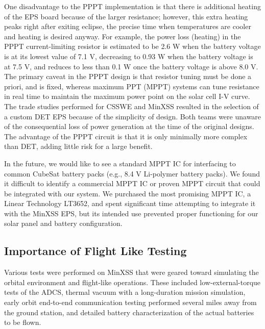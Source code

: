 One disadvantage to the PPPT implementation is that there is additional heating of the EPS board because of the larger resistance; however, this extra heating peaks right after exiting eclipse, the precise time when temperatures are cooler and heating is desired anyway. For example, the power loss (heating) in the PPPT current-limiting resistor is estimated to be 2.6 W when the battery voltage is at its lowest value of 7.1 V, decreasing to 0.93 W when the battery voltage is at 7.5 V, and reduces to less than 0.1 W once the battery voltage is above 8.0 V. The primary caveat in the PPPT design is that resistor tuning must be done a priori, and is fixed, whereas maximum PPT (MPPT) systems can tune resistance in real time to maintain the maximum power point on the solar cell I-V curve. The trade studies performed for CSSWE and MinXSS resulted in the selection of a custom DET EPS because of the simplicity of design. Both teams were unaware of the consequential loss of power generation at the time of the original designs. The advantage of the PPPT circuit is that it is only minimally more complex than DET, adding little risk for a large benefit.

In the future, we would like to see a standard MPPT IC for interfacing to common CubeSat battery packs (e.g., 8.4 V Li-polymer battery packs). We found it difficult to identify a commercial MPPT IC or proven MPPT circuit that could be integrated with our system. We purchased the most promising MPPT IC, a Linear Technology LT3652, and spent significant time attempting to integrate it with the MinXSS EPS, but its intended use prevented proper functioning for our solar panel and battery configuration.

\subsection{Importance of Flight Like Testing}
\label{sec:missiontesting}
Various tests were performed on MinXSS that were geared toward simulating the orbital environment and flight-like operations. These included low-external-torque tests of the ADCS, thermal vacuum with a long-duration mission simulation, early orbit end-to-end communication testing performed several miles away from the ground station, and detailed battery characterization of the actual batteries to be flown.

